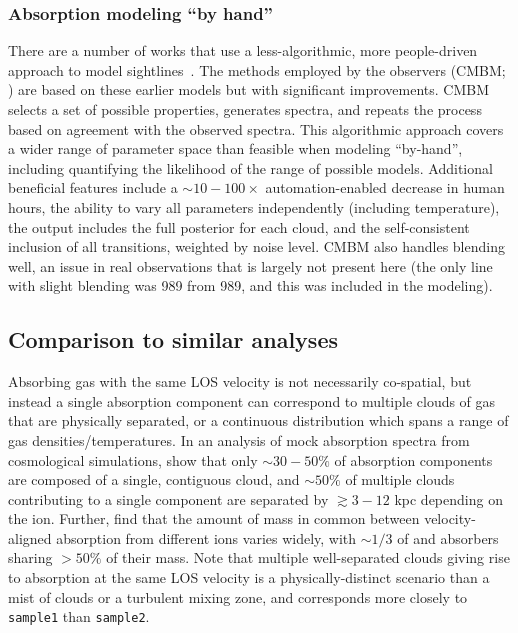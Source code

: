 \documentclass[fleqn,usenatbib]{mnras}
\begin{document}
\subsubsection{Absorption modeling ``by hand''}

There are a number of works that use a less-algorithmic, more people-driven approach to model sightlines~\citep[e.g.][]{churchill1999Multiple, charlton2000anticipating, charlton2003high, ding2003quadruple, ding2003multiphase, ding2005absorption, zonak2004absorption, masiero2005models, lynch2007physical, misawa2008supersolar, lacki2010z, jones2010bare, muzahid2015Extreme, richter2018New, rosenwasser2018understanding, norris2021Discovery}.
The methods employed by the observers (CMBM; \citealt{sameer2021Cloudbycloud, sameer2022Probing}) are based on these earlier models but with significant improvements.
CMBM selects a set of possible properties, generates spectra, and repeats the process based on agreement with the observed spectra.
This algorithmic approach covers a wider range of parameter space than feasible when modeling ``by-hand'', including quantifying the likelihood of the range of possible models.
Additional beneficial features include
a $\sim 10-100 \times$ automation-enabled decrease in human hours,
the ability to vary all parameters independently (including temperature),
the output includes the full posterior for each cloud,
and the self-consistent inclusion of all transitions, weighted by noise level.
CMBM also handles blending well, an issue in real observations that is largely not present here
(the only line with slight blending was  989 from  989, and this was included in the modeling).

\subsection{Comparison to similar analyses}

Absorbing gas with the same LOS velocity is not necessarily co-spatial, but instead a single absorption component can correspond to multiple clouds of gas that are physically separated, or a continuous distribution which spans a range of gas densities/temperatures. 
In an analysis of mock absorption spectra from cosmological simulations, \cite{marra2022Examining} show that only $\sim 30-50\%$ of absorption components are composed of a single, contiguous cloud, and $\sim 50\%$ of multiple clouds contributing to a single component are separated by $\gtrsim 3-12$ kpc depending on the ion.
Further, \cite{marra2022Examining} find that the amount of mass in common between velocity-aligned absorption from different ions varies widely, with $\sim 1/3$ of  and  absorbers sharing $>50\%$ of their mass.
Note that multiple well-separated clouds giving rise to absorption at the same LOS velocity is a physically-distinct scenario than a mist of clouds or a turbulent mixing zone, and corresponds more closely to \texttt{sample1} than \texttt{sample2}.
\end{document}
